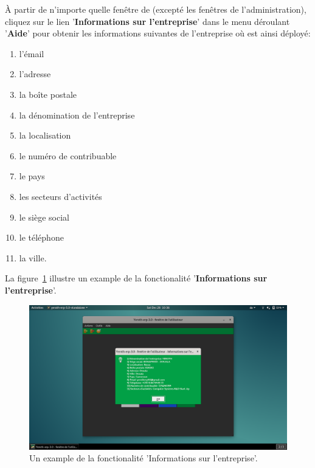 

\`A partir de n'importe quelle fen\^etre de \yeroth (except\'e
les fen\^etres de l'administration), cliquez
sur le lien '\textbf{Informations sur l'entreprise}' dans
le menu d\'eroulant '\textbf{Aide}' pour obtenir les
informations suivantes de l'entreprise o\`u \yeroth
est ainsi d\'eploy\'e:

\begin{enumerate}[1)]
	\item l'\'email
	\item l'adresse
	\item la bo\^ite postale
	\item la d\'enomination de l'entreprise
	\item la localisation
	\item le num\'ero de contribuable	
	\item le pays
	\item les secteurs d'activit\'es
	\item le si\`ege social
	\item le t\'el\'ephone
	\item la ville.
\end{enumerate}

La figure~\ref{fig:yeren-informations-generales-entreprise}
illustre un example de la fonctionalit\'e 
'\textbf{Informations sur l'entreprise}'.\\

\begin{figure}[!htbp]
	\centering
	\includegraphics[scale=0.4]{images/yeren-informations-generales-entreprise.png}
	\caption{Un example de la fonctionalit\'e 'Informations sur l'entreprise'.}
	\label{fig:yeren-informations-generales-entreprise}
\end{figure}

